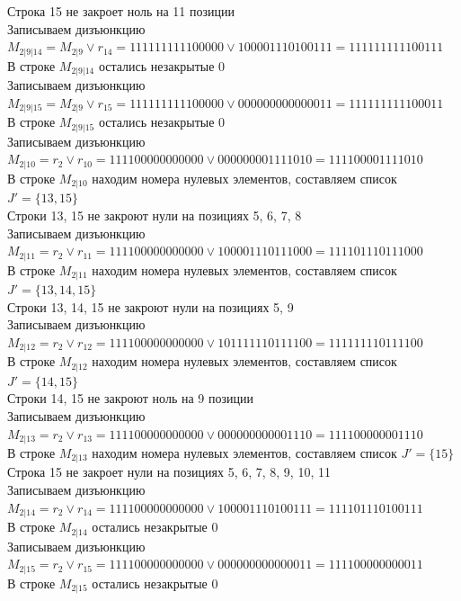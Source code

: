 \documentclass[12pt,a4paper]{report}
\begin{document}
Строка 15 не закроет ноль на 11 позиции \\
Записываем дизъюнкцию $M_{2 | 9 | 14} = M_{2 | 9}\vee r_{14} = 111111111100000 \vee 100001110100111 = 111111111100111$ \\
В строке $M_{2 | 9 | 14}$ остались незакрытые $0$ \\
Записываем дизъюнкцию $M_{2 | 9 | 15} = M_{2 | 9}\vee r_{15} = 111111111100000 \vee 000000000000011 = 111111111100011$ \\
В строке $M_{2 | 9 | 15}$ остались незакрытые $0$ \\
Записываем дизъюнкцию $M_{2 | 10} = r_{2}\vee r_{10} = 111100000000000 \vee 000000001111010 = 111100001111010$ \\
В строке $M_{2 | 10}$ находим номера нулевых элементов, составляем список $J' = \{13, 15\}$ \\
Строки 13, 15 не закроют нули на позициях 5, 6, 7, 8 \\
Записываем дизъюнкцию $M_{2 | 11} = r_{2}\vee r_{11} = 111100000000000 \vee 100001110111000 = 111101110111000$ \\
В строке $M_{2 | 11}$ находим номера нулевых элементов, составляем список $J' = \{13, 14, 15\}$ \\
Строки 13, 14, 15 не закроют нули на позициях 5, 9 \\
Записываем дизъюнкцию $M_{2 | 12} = r_{2}\vee r_{12} = 111100000000000 \vee 101111110111100 = 111111110111100$ \\
В строке $M_{2 | 12}$ находим номера нулевых элементов, составляем список $J' = \{14, 15\}$ \\
Строки 14, 15 не закроют ноль на 9 позиции \\
Записываем дизъюнкцию $M_{2 | 13} = r_{2}\vee r_{13} = 111100000000000 \vee 000000000001110 = 111100000001110$ \\
В строке $M_{2 | 13}$ находим номера нулевых элементов, составляем список $J' = \{15\}$ \\
Строка 15 не закроет нули на позициях 5, 6, 7, 8, 9, 10, 11 \\
Записываем дизъюнкцию $M_{2 | 14} = r_{2}\vee r_{14} = 111100000000000 \vee 100001110100111 = 111101110100111$ \\
В строке $M_{2 | 14}$ остались незакрытые $0$ \\
Записываем дизъюнкцию $M_{2 | 15} = r_{2}\vee r_{15} = 111100000000000 \vee 000000000000011 = 111100000000011$ \\
В строке $M_{2 | 15}$ остались незакрытые $0$ \\
\end{document}
